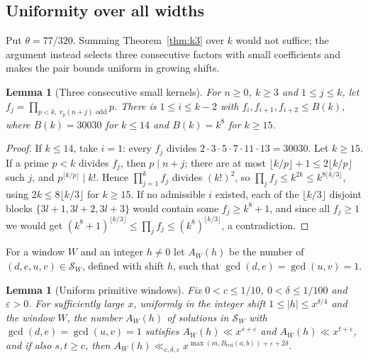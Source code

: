 \documentclass[11pt,reqno]{amsart}
\newtheorem{lemma}[theorem]{Lemma}
\theoremstyle{definition}
\theoremstyle{remark}
\numberwithin{equation}{section}
\newcommand{\Bred}{B_{\mathrm{red}}}
\begin{document}
\subsection{Uniformity over all widths}\label{sec:uniform}
Put $\theta=77/320$. Summing Theorem~\ref{thm:k3} over $k$ would not suffice;
the argument instead selects three consecutive factors with small coefficients
and makes the pair bounds uniform in growing shifts.

\begin{lemma}[Three consecutive small kernels]\label{lem:goodtriple}
For $n\ge0$, $k\ge3$ and $1\le j\le k$, let
$f_j=\prod_{p<k,\ v_p(n+j)\text{ odd}}p$. There is $1\le i\le k-2$ with
$f_i,f_{i+1},f_{i+2}\le B(k)$, where $B(k)=30030$ for $k\le14$ and
$B(k)=k^8$ for $k\ge15$.
\end{lemma}

\begin{proof}
If $k\le14$, take $i=1$: every $f_j$ divides $2\cdot3\cdot5\cdot7\cdot11\cdot13=30030$.
Let $k\ge15$. If a prime $p<k$ divides $f_j$, then $p\mid n+j$; there are at
most $\lfloor k/p\rfloor+1\le2\lfloor k/p\rfloor$ such $j$, and
$p^{\lfloor k/p\rfloor}\mid k!$. Hence $\prod_{j=1}^kf_j$ divides $(k!)^2$, so
$\prod_jf_j\le k^{2k}\le k^{8\lfloor k/3\rfloor}$, using $2k\le8\lfloor k/3\rfloor$
for $k\ge15$. If no admissible $i$ existed, each of the $\lfloor k/3\rfloor$
disjoint blocks $\{3l+1,3l+2,3l+3\}$ would contain some $f_j\ge k^8+1$, and
since all $f_j\ge1$ we would get
$(k^8+1)^{\lfloor k/3\rfloor}\le\prod_jf_j\le(k^8)^{\lfloor k/3\rfloor}$, a
contradiction.
\end{proof}

For a window $W$ and an integer $h\ne0$ let $A_W(h)$ be the number of
$(d,e,u,v)\in\mathcal S_W$, defined with shift $h$, such that
$\gcd(d,e)=\gcd(u,v)=1$.

\begin{lemma}[Uniform primitive windows]\label{lem:uniformwindows}
Fix $0<c\le1/10$, $0<\delta\le1/100$ and $\varepsilon>0$. For sufficiently
large $x$, uniformly in the integer shift $1\le |h|\le x^{\delta/4}$ and the
window $W$, the number $A_W(h)$ of solutions in $\mathcal S_W$ with
$\gcd(d,e)=\gcd(u,v)=1$ satisfies $A_W(h)\ll x^{s+\varepsilon}$ and
$A_W(h)\ll x^{t+\varepsilon}$, and if also $s,t\ge c$, then
$A_W(h)\ll_{c,\delta,\varepsilon}x^{\max(m,\Bred(a,b))+\varepsilon+2\delta}$.
\end{lemma}
\end{document}
